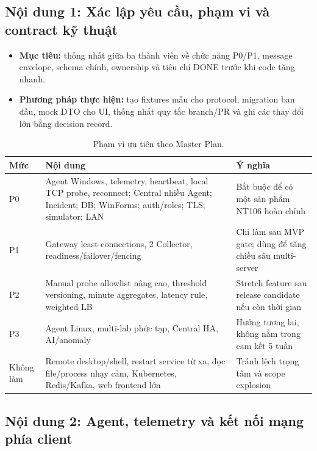 
\subsection{Nội dung 1: Xác lập yêu cầu, phạm vi và contract kỹ thuật}

\begin{itemize}
    \item \textbf{Mục tiêu:} thống nhất giữa ba thành viên về chức năng P0/P1, message envelope, schema chính, ownership và tiêu chí DONE trước khi code tăng nhanh.
    \item \textbf{Phương pháp thực hiện:} tạo fixtures mẫu cho protocol, migration ban đầu, mock DTO cho UI, thống nhất quy tắc branch/PR và ghi các thay đổi lớn bằng decision record.
\end{itemize}

\begin{table}[!ht]
\centering
\caption{Phạm vi ưu tiên theo Master Plan.}
\label{tab:scope-priority}
\small
\begin{tabularx}{\textwidth}{p{1.2cm} X X}
\toprule
\textbf{Mức} & \textbf{Nội dung} & \textbf{Ý nghĩa} \\
\midrule
P0 & Agent Windows, telemetry, heartbeat, local TCP probe, reconnect; Central nhiều Agent; Incident; DB; WinForms; auth/roles; TLS; simulator; LAN & Bắt buộc để có một sản phẩm NT106 hoàn chỉnh \\
P1 & Gateway least-connections, 2 Collector, readiness/failover/fencing & Chỉ làm sau MVP gate; dùng để tăng chiều sâu multi-server \\
P2 & Manual probe allowlist nâng cao, threshold versioning, minute aggregates, latency rule, weighted LB & Stretch feature sau release candidate nếu còn thời gian \\
P3 & Agent Linux, multi-lab phức tạp, Central HA, AI/anomaly & Hướng tương lai, không nằm trong cam kết 5 tuần \\
Không làm & Remote desktop/shell, restart service từ xa, đọc file/process nhạy cảm, Kubernetes, Redis/Kafka, web frontend lớn & Tránh lệch trọng tâm và scope explosion \\
\bottomrule
\end{tabularx}
\end{table}

\subsection{Nội dung 2: Agent, telemetry và kết nối mạng phía client}

